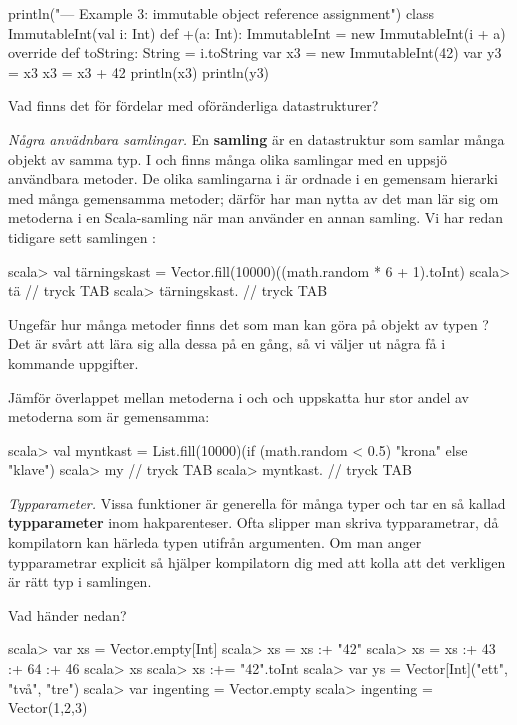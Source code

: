 \begin{Code}
println("\n--- Example 3: immutable object reference assignment")
class ImmutableInt(val i: Int) {
  def +(a: Int): ImmutableInt = new ImmutableInt(i + a) 
  override def toString: String = i.toString
}
var x3 = new ImmutableInt(42)
var y3 = x3
x3 = x3 + 42
println(x3)
println(y3)
\end{Code}

\Subtask\Pen Vad finns det för fördelar med oföränderliga datastrukturer?


\Task \emph{Några anvädnbara samlingar.} En \textbf{samling}  är en datastruktur som samlar många objekt av samma typ. I  och  finns många olika samlingar med en uppsjö användbara metoder. De olika samlingarna i  är ordnade i en gemensam hierarki med många gemensamma metoder; därför har man nytta av det man lär sig om metoderna i en Scala-samling när man använder en annan samling. Vi har redan tidigare sett samlingen :

\begin{REPL}
scala> val tärningskast = Vector.fill(10000)((math.random * 6 + 1).toInt)
scala> tä   // tryck TAB
scala> tärningskast.  // tryck TAB
\end{REPL}

\Subtask Ungefär hur många metoder finns det som man kan göra på objekt av typen ? Det är svårt att lära sig alla dessa på en gång, så vi väljer ut några få i kommande uppgifter.

\Subtask Jämför överlappet mellan metoderna i  och  och uppskatta hur stor andel av metoderna som är gemensamma: 
\begin{REPL}
scala> val myntkast = 
         List.fill(10000)(if (math.random < 0.5) "krona" else "klave")
scala> my   // tryck TAB
scala> myntkast.  // tryck TAB
\end{REPL}

\Task \emph{Typparameter.} Vissa funktioner är generella för många typer och tar en så kallad \textbf{typparameter} inom hakparenteser. Ofta slipper man skriva typparametrar, då kompilatorn kan härleda typen utifrån argumenten. Om man anger typparametrar explicit så hjälper kompilatorn dig med att kolla att det verkligen är rätt typ i samlingen. 

\Subtask Vad händer nedan?
\begin{REPL}
scala> var xs = Vector.empty[Int]
scala> xs = xs :+ "42" 
scala> xs = xs :+ 43 :+ 64 :+ 46
scala> xs
scala> xs :+= "42".toInt 
scala> var ys = Vector[Int]("ett", "två", "tre")
scala> var ingenting = Vector.empty 
scala> ingenting = Vector(1,2,3)
\end{REPL}

